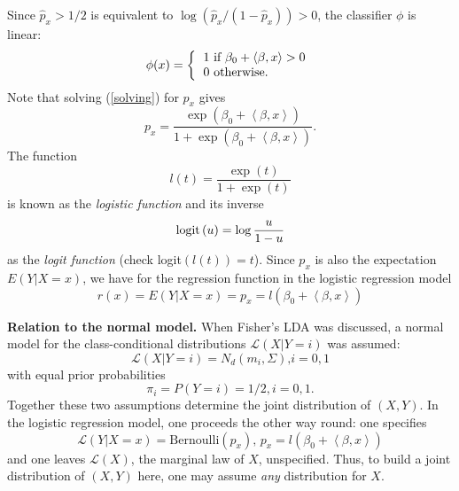 \documentclass[11pt,twoside]{article}%
\theoremstyle{change}
\begin{document}
Since $\hat{p}_{x}>1/2$ is equivalent to $\log\left(  \hat{p}_{x}/\left(
1-\hat{p}_{x}\right)  \right)  >0$, the classifier $\phi$ is linear:%
\[
\phi(x)=\left\{
\begin{tabular}
[c]{l}%
$1$ if $\beta_{0}+\left\langle \beta,x\right\rangle >0$\\
$0$ otherwise.
\end{tabular}
\right.
\]
Note that solving (\ref{solving}) for $p_{x}$ gives
\[
p_{x}=\frac{\exp\left(  \beta_{0}+\left\langle \beta,x\right\rangle \right)
}{1+\exp\left(  \beta_{0}+\left\langle \beta,x\right\rangle \right)  }.
\]
The function
\[
l(t)=\frac{\exp\left(  t\right)  }{1+\exp\left(  t\right)  }%
\]
is known as the \textit{logistic function }and its inverse
\[
\text{\textrm{logit}}\left(  u\right)  =\log\frac{u}{1-u}%
\]
as the \textit{logit function} (check \textrm{logit}$\left(  l(t)\right)
=t$). Since $p_{x}$ is also the expectation $E\left(  Y|X=x\right)  $, we have
for the regression function in the logistic regression model
\[
r(x)=E\left(  Y|X=x\right)  =p_{x}=l(\beta_{0}+\left\langle \beta
,x\right\rangle )
\]


\bigskip\bigskip\textbf{Relation to the normal model. }When Fisher's LDA was
discussed, a normal model for the class-conditional distributions
$\mathcal{L}\left(  X|Y=i\right)  $ was assumed:
\begin{equation}
\mathcal{L}\left(  X|Y=i\right)  =N_{d}\left(  m_{i},\Sigma\right)  \text{,
}i=0,1\label{class-condit-normal-1}%
\end{equation}
with equal prior probabilities
\begin{equation}
\pi_{i}=P\left(  Y=i\right)  =1/2,i=0,1.\label{class-condit-normal-2}%
\end{equation}
Together these two assumptions determine the joint distribution of $\left(
X,Y\right)  $. In the logistic regression model, one proceeds the other way
round: one specifies%
\begin{equation}
\mathcal{L}\left(  Y|X=x\right)  =\mathrm{Bernoulli}\left(  p_{x}\right)
\text{, }p_{x}=l(\beta_{0}+\left\langle \beta,x\right\rangle
)\label{lgist-reg-mod}%
\end{equation}
and one leaves $\mathcal{L}\left(  X\right)  $, the marginal law of $X$,
unspecified. Thus, to build a joint distribution of $\left(  X,Y\right)  $
here, one may assume \textit{any } distribution for $X$.
\end{document}
